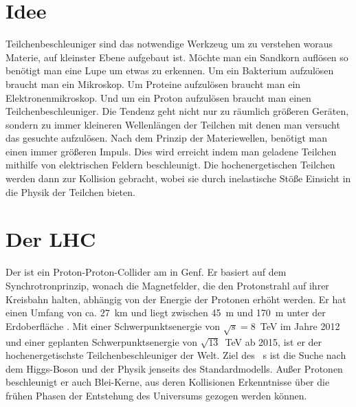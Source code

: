 \section{Idee}
Teilchenbeschleuniger sind das notwendige Werkzeug um zu verstehen woraus Materie, auf kleinster Ebene aufgebaut ist. Möchte man ein Sandkorn auflösen so benötigt man eine Lupe um etwas zu erkennen. Um ein Bakterium aufzulösen braucht man ein Mikroskop. Um Proteine aufzulösen braucht man ein Elektronenmikroskop. Und um ein Proton aufzulösen braucht man einen Teilchenbeschleuniger. Die Tendenz geht nicht nur zu räumlich größeren Geräten, sondern zu immer kleineren Wellenlängen der Teilchen mit denen man versucht das gesuchte aufzulösen. Nach dem Prinzip der Materiewellen, benötigt man einen immer größeren Impuls. Dies wird erreicht indem man geladene Teilchen mithilfe von elektrischen Feldern beschleunigt. Die hochenergetischen Teilchen werden dann zur Kollision gebracht, wobei sie durch inelastische Stöße Einsicht in die Physik der Teilchen bieten.

\section{Der LHC}
Der \lhc ist ein Proton-Proton-Collider am \cern in Genf. Er basiert auf dem Synchrotronprinzip, wonach die Magnetfelder, die den Protonstrahl auf ihrer Kreisbahn halten, abhängig von der Energie der Protonen erhöht werden. Er hat einen Umfang von ca. $27$~km und liegt zwischen 45~m und 170~m unter der Erdoberfläche \cite{1748-0221-3-08-S08001}. Mit einer Schwerpunktsenergie von $\sqrt{s} = 8$~TeV im Jahre 2012 und einer geplanten Schwerpunktsenergie von $\sqrt{13}$~TeV ab 2015, ist er der hochenergetischste Teilchenbeschleuniger der Welt. Ziel des \lhc\ s ist die Suche nach dem Higgs-Boson und der Physik jenseits des Standardmodells.
Außer Protonen beschleunigt er auch Blei-Kerne, aus deren Kollisionen Erkenntnisse über die frühen Phasen der Entstehung des Universums gezogen werden können. 

